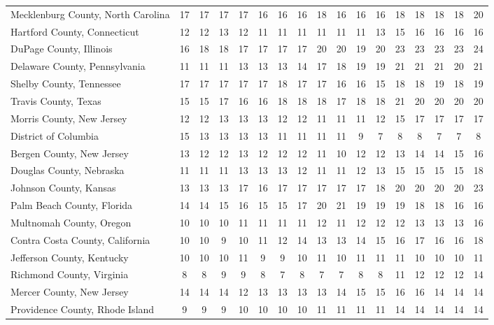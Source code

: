 \begin{landscape}
\begin{longtable}{lcccccccccccccccc}
	Mecklenburg County, North Carolina & 17 & 17 & 17 & 17 & 16 & 16 & 16 & 18 & 16 & 16 & 16 & 18 & 18 & 18 & 18 & 20 \\
	Hartford County, Connecticut & 12 & 12 & 13 & 12 & 11 & 11 & 11 & 11 & 11 & 11 & 13 & 15 & 16 & 16 & 16 & 16 \\
	DuPage County, Illinois & 16 & 18 & 18 & 17 & 17 & 17 & 17 & 20 & 20 & 19 & 20 & 23 & 23 & 23 & 23 & 24 \\
	Delaware County, Pennsylvania & 11 & 11 & 11 & 13 & 13 & 13 & 14 & 17 & 18 & 19 & 19 & 21 & 21 & 21 & 20 & 21 \\
	Shelby County, Tennessee & 17 & 17 & 17 & 17 & 17 & 18 & 17 & 17 & 16 & 16 & 15 & 18 & 18 & 19 & 18 & 19 \\
	Travis County, Texas & 15 & 15 & 17 & 16 & 16 & 18 & 18 & 18 & 17 & 18 & 18 & 21 & 20 & 20 & 20 & 20 \\
	Morris County, New Jersey & 12 & 12 & 13 & 13 & 13 & 12 & 12 & 11 & 11 & 11 & 12 & 15 & 17 & 17 & 17 & 17 \\
	District of Columbia & 15 & 13 & 13 & 13 & 13 & 11 & 11 & 11 & 11 & 9 & 7 & 8 & 8 & 7 & 7 & 8 \\
	Bergen County, New Jersey & 13 & 12 & 12 & 13 & 12 & 12 & 12 & 11 & 10 & 12 & 12 & 13 & 14 & 14 & 15 & 16 \\
	Douglas County, Nebraska & 11 & 11 & 11 & 13 & 13 & 13 & 12 & 11 & 11 & 12 & 13 & 15 & 15 & 15 & 15 & 18 \\
	Johnson County, Kansas & 13 & 13 & 13 & 17 & 16 & 17 & 17 & 17 & 17 & 17 & 18 & 20 & 20 & 20 & 20 & 23 \\
	Palm Beach County, Florida & 14 & 14 & 15 & 16 & 15 & 15 & 17 & 20 & 21 & 19 & 19 & 19 & 18 & 18 & 16 & 16 \\
	Multnomah County, Oregon & 10 & 10 & 10 & 11 & 11 & 11 & 11 & 12 & 11 & 12 & 12 & 12 & 13 & 13 & 13 & 16 \\
	Contra Costa County, California & 10 & 10 & 9 & 10 & 11 & 12 & 14 & 13 & 13 & 14 & 15 & 16 & 17 & 16 & 16 & 18 \\
	Jefferson County, Kentucky & 10 & 10 & 10 & 11 & 9 & 9 & 10 & 11 & 10 & 11 & 11 & 11 & 10 & 10 & 10 & 11 \\
	Richmond County, Virginia & 8 & 8 & 9 & 9 & 8 & 7 & 8 & 7 & 7 & 8 & 8 & 11 & 12 & 12 & 12 & 14 \\
	Mercer County, New Jersey & 14 & 14 & 14 & 12 & 13 & 13 & 13 & 13 & 14 & 15 & 15 & 16 & 16 & 14 & 14 & 14 \\
	Providence County, Rhode Island & 9 & 9 & 9 & 10 & 10 & 10 & 10 & 11 & 11 & 11 & 11 & 14 & 14 & 14 & 14 & 14 \\

\end{longtable}
\end{landscape}
